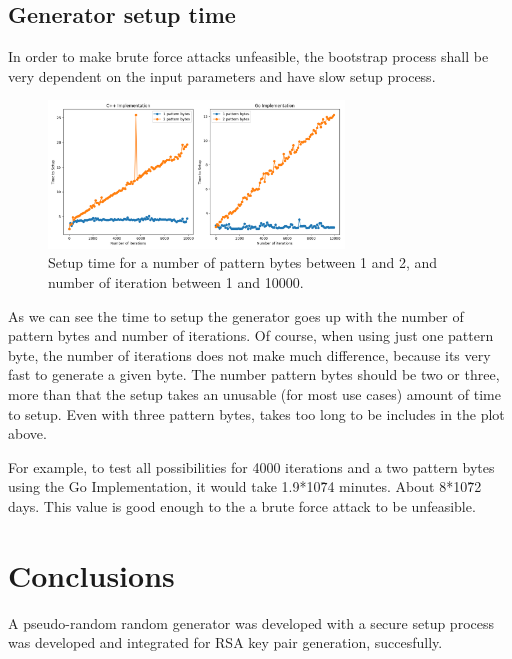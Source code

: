 \documentclass{article} %
\begin{document}
\subsection{Generator setup time}
In order to make brute force attacks unfeasible, the bootstrap process shall be very dependent on the input parameters and have slow setup process.

\begin{figure}[!ht]
  \label{figure:apache_headers}
  \centering
  \includegraphics[width=0.7\textwidth]{assets/randgen_plot1.png}
  \caption{Setup time for a number of pattern bytes between 1 and 2, and number of iteration between 1 and 10000.}
\end{figure}

As we can see the time to setup the generator goes up with the number of pattern bytes and number of iterations. Of course, when using 
just one pattern byte, the number of iterations does not make much difference, because its very fast to generate a given byte. The number pattern bytes
should be two or three, more than that the setup takes an unusable (for most use cases) amount of time to setup. Even with three pattern bytes, takes too long
to be includes in the plot above.

For example, to test all possibilities for 4000 iterations and a two pattern bytes using the Go Implementation, it would take 1.9*10\^74 minutes. About 8*10\^72 days.
This value is good enough to the a brute force attack to be unfeasible.


\section{Conclusions}
A pseudo-random random generator was developed with a secure setup process was developed and integrated for RSA key pair generation, succesfully.
\end{document}
